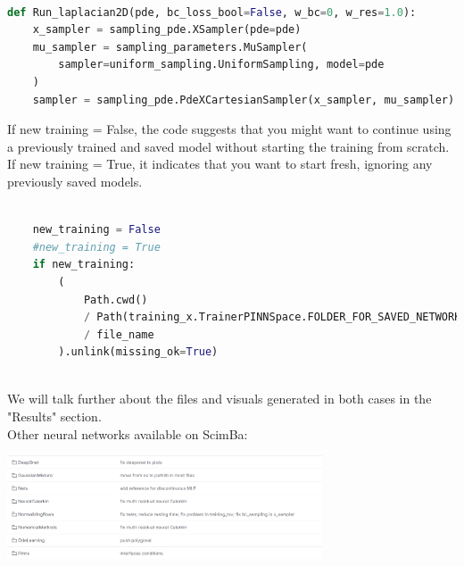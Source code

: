 \documentclass[12pt]{article}
\begin{document}
\begin{lstlisting}[language=Python,caption={},frame=single, backgroundcolor=\color{gray!10}, basicstyle=\footnotesize,rulecolor=\color{blue}, framexleftmargin=3pt, commentstyle=\color{mygreen}, keywordstyle=\color{blue}]

def Run_laplacian2D(pde, bc_loss_bool=False, w_bc=0, w_res=1.0):
    x_sampler = sampling_pde.XSampler(pde=pde)
    mu_sampler = sampling_parameters.MuSampler(
        sampler=uniform_sampling.UniformSampling, model=pde
    )
    sampler = sampling_pde.PdeXCartesianSampler(x_sampler, mu_sampler)

\end{lstlisting}
\newpage
If new training = False, the code suggests that you might want to continue using a previously trained and saved model without starting the training from scratch.
If new training = True, it indicates that you want to start fresh, ignoring any previously saved models.
\begin{lstlisting}[language=Python,caption={},frame=single, backgroundcolor=\color{gray!10}, basicstyle=\footnotesize,rulecolor=\color{blue}, framexleftmargin=3pt, commentstyle=\color{mygreen}, keywordstyle=\color{blue}]

    new_training = False
    #new_training = True
    if new_training:
        (
            Path.cwd()
            / Path(training_x.TrainerPINNSpace.FOLDER_FOR_SAVED_NETWORKS)
            / file_name
        ).unlink(missing_ok=True)
        
\end{lstlisting}

We will talk further about the files and visuals generated in both cases in the "Results" section.
\\
Other neural networks available on ScimBa:
\begin{frame}{}
    \begin{center}
        \includegraphics[width=0.7\textwidth]{images/ScimBa neural networks.png}
    \end{center}
\end{frame}

\end{document}
